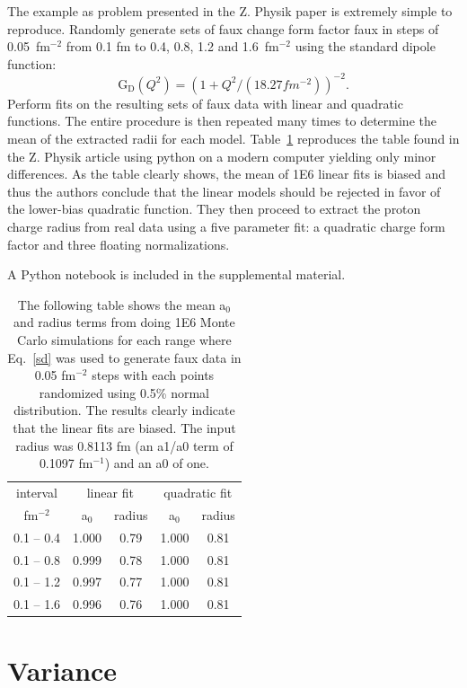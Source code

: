 \documentclass[10pt,aps,prc,twocolumn]{revtex4-1}
\begin{document}
The example as problem presented in the Z. Physik paper is extremely simple to reproduce.   
Randomly generate sets of faux change form factor faux in steps of 0.05~fm$^{-2}$ from 0.1 fm to 0.4, 0.8, 1.2
and 1.6~fm$^{-2}$ using the standard dipole function:
\begin{equation}
\label{sd}
\mathrm{G_D}(Q^2) = ( 1 + Q^2/(18.27 fm^{-2}))^{-2}.
\end{equation}
Perform fits on the resulting sets of faux data with linear and quadratic functions. The entire procedure is
then repeated many times to determine the mean of the extracted radii for each model. Table~\ref{ztable} reproduces the table found in the
Z. Physik article using python on a modern computer yielding only minor differences.
As the table clearly shows, the mean of 1E6 linear fits is biased and thus the authors conclude that 
the linear models should be rejected in favor of the lower-bias quadratic function. They then proceed to extract
the proton charge radius from real data using a five parameter fit: a quadratic charge form factor and three floating normalizations.

A Python notebook is included in the supplemental material.

\begin{table}
\label{ztable}
\caption{The following table shows the mean a$_0$ and radius terms from doing 1E6 Monte Carlo simulations
for each range
where Eq.~\ref{sd} was used to generate faux data in 0.05 fm$^{-2}$ steps with each points randomized using
0.5\% normal distribution.   The results clearly indicate that the linear fits are biased.   The input
radius was 0.8113 fm (an a1/a0 term of 0.1097 fm$^{-1}$) and an a0 of one.}
\begin{tabular}{c|cc|cc} \hline
interval       & \multicolumn{2}{c|}{linear fit} & \multicolumn{2}{c}{quadratic fit}  \\
fm$^{-2}$      & a$_0$      & radius          & a$_0$    & radius \\ \hline
 0.1 -- 0.4 & 1.000& 0.79& 1.000& 0.81 \\
 0.1 -- 0.8 & 0.999& 0.78& 1.000& 0.81 \\
 0.1 -- 1.2 & 0.997& 0.77& 1.000& 0.81 \\
 0.1 -- 1.6 & 0.996& 0.76& 1.000& 0.81 \\ \hline
\end{tabular}
\end{table}

\section{Variance}
\end{document}
